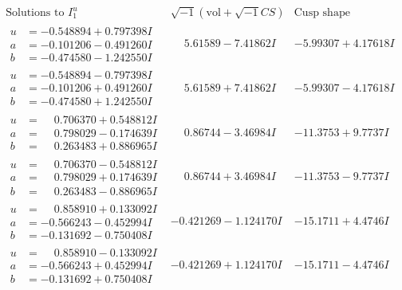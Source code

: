 \documentclass[1p]{elsarticle_modified}
\theoremstyle{definition}
\newcommand{\I}{\sqrt{-1}}
\begin{document}
$$\begin{array}{c|c|c}  
\text{Solutions to }I^u_{1}& \I (\text{vol} + \sqrt{-1}CS) & \text{Cusp shape}\\
 \hline 
\begin{aligned}
u &= -0.548894 + 0.797398 I \\
a &= -0.101206 - 0.491260 I \\
b &= -0.474580 - 1.242550 I\end{aligned}
 & \phantom{-}5.61589 - 7.41862 I & -5.99307 + 4.17618 I \\ \hline\begin{aligned}
u &= -0.548894 - 0.797398 I \\
a &= -0.101206 + 0.491260 I \\
b &= -0.474580 + 1.242550 I\end{aligned}
 & \phantom{-}5.61589 + 7.41862 I & -5.99307 - 4.17618 I \\ \hline\begin{aligned}
u &= \phantom{-}0.706370 + 0.548812 I \\
a &= \phantom{-}0.798029 - 0.174639 I \\
b &= \phantom{-}0.263483 + 0.886965 I\end{aligned}
 & \phantom{-}0.86744 - 3.46984 I & -11.3753 + 9.7737 I \\ \hline\begin{aligned}
u &= \phantom{-}0.706370 - 0.548812 I \\
a &= \phantom{-}0.798029 + 0.174639 I \\
b &= \phantom{-}0.263483 - 0.886965 I\end{aligned}
 & \phantom{-}0.86744 + 3.46984 I & -11.3753 - 9.7737 I \\ \hline\begin{aligned}
u &= \phantom{-}0.858910 + 0.133092 I \\
a &= -0.566243 - 0.452994 I \\
b &= -0.131692 - 0.750408 I\end{aligned}
 & -0.421269 - 1.124170 I & -15.1711 + 4.4746 I \\ \hline\begin{aligned}
u &= \phantom{-}0.858910 - 0.133092 I \\
a &= -0.566243 + 0.452994 I \\
b &= -0.131692 + 0.750408 I\end{aligned}
 & -0.421269 + 1.124170 I & -15.1711 - 4.4746 I \\ \hline\begin{aligned}

\end{aligned}
\end{array}$$
\end{document}
